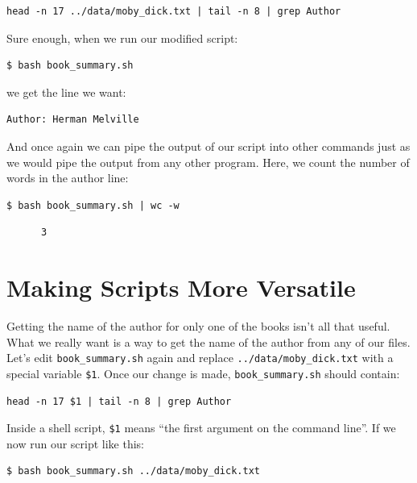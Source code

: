 \documentclass[
]{krantz}
\begin{document}
\begin{verbatim}
head -n 17 ../data/moby_dick.txt | tail -n 8 | grep Author
\end{verbatim}

Sure enough,
when we run our modified script:

\begin{verbatim}
$ bash book_summary.sh
\end{verbatim}

we get the line we want:

\begin{verbatim}
Author: Herman Melville
\end{verbatim}

And once again
we can pipe the output of our script into other commands
just as we would pipe the output from any other program.
Here,
we count the number of words in the author line:

\begin{verbatim}
$ bash book_summary.sh | wc -w
\end{verbatim}

\begin{verbatim}
      3
\end{verbatim}

\hypertarget{bash-advanced-params}{%
\section{Making Scripts More Versatile}\label{bash-advanced-params}}

Getting the name of the author for only one of the books isn't all that useful.
What we really want is a way to get the name of the author from any of our files.
Let's edit \texttt{book\_summary.sh} again
and replace \texttt{../data/moby\_dick.txt} with
a special variable \texttt{\$1}.
Once our change is made,
\texttt{book\_summary.sh} should contain:

\begin{verbatim}
head -n 17 $1 | tail -n 8 | grep Author
\end{verbatim}

Inside a shell script,
\texttt{\$1} means ``the first argument on the command line''.
If we now run our script like this:

\begin{verbatim}
$ bash book_summary.sh ../data/moby_dick.txt
\end{verbatim}
\end{document}
